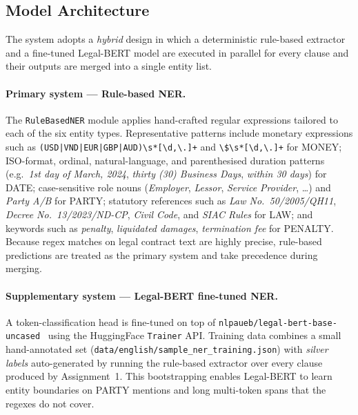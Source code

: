\documentclass[assignment.tex]{subfiles}
\begin{document}
\subsection{Model Architecture}

The system adopts a \emph{hybrid} design in which a deterministic rule-based
extractor and a fine-tuned Legal-BERT model are executed in parallel for every
clause and their outputs are merged into a single entity list.

\paragraph{Primary system — Rule-based NER.}
The \texttt{RuleBasedNER} module applies hand-crafted regular expressions
tailored to each of the six entity types.  Representative patterns include
monetary expressions such as
\texttt{(USD|VND|EUR|GBP|AUD)\textbackslash s*[\textbackslash d,\textbackslash.]+}
and \texttt{\textbackslash\$\textbackslash s*[\textbackslash d,\textbackslash.]+}
for MONEY; ISO-format, ordinal, natural-language, and parenthesised duration
patterns (e.g.\ \textit{1st day of March, 2024}, \textit{thirty (30) Business
Days}, \textit{within 30 days}) for DATE; case-sensitive role nouns
(\textit{Employer}, \textit{Lessor}, \textit{Service Provider}, \ldots) and
\textit{Party A/B} for PARTY; statutory references such as
\textit{Law No.\ 50/2005/QH11}, \textit{Decree No.\ 13/2023/ND-CP},
\textit{Civil Code}, and \textit{SIAC Rules} for LAW; and keywords such as
\textit{penalty}, \textit{liquidated damages}, \textit{termination fee} for
PENALTY.  Because regex matches on legal contract text are highly precise,
rule-based predictions are treated as the primary system and take precedence
during merging.

\paragraph{Supplementary system — Legal-BERT fine-tuned NER.}
A token-classification head is fine-tuned on top of
\texttt{nlpaueb/legal-bert-base-uncased}~\cite{chalkidis2020legal} using the
HuggingFace \texttt{Trainer} API.  Training data combines a small
hand-annotated set
(\texttt{data/english/sample\_ner\_training.json}) with \emph{silver labels}
auto-generated by running the rule-based extractor over every clause produced
by Assignment~1.  This bootstrapping enables Legal-BERT to learn entity
boundaries on PARTY mentions and long multi-token spans that the regexes do
not cover.
\end{document}
